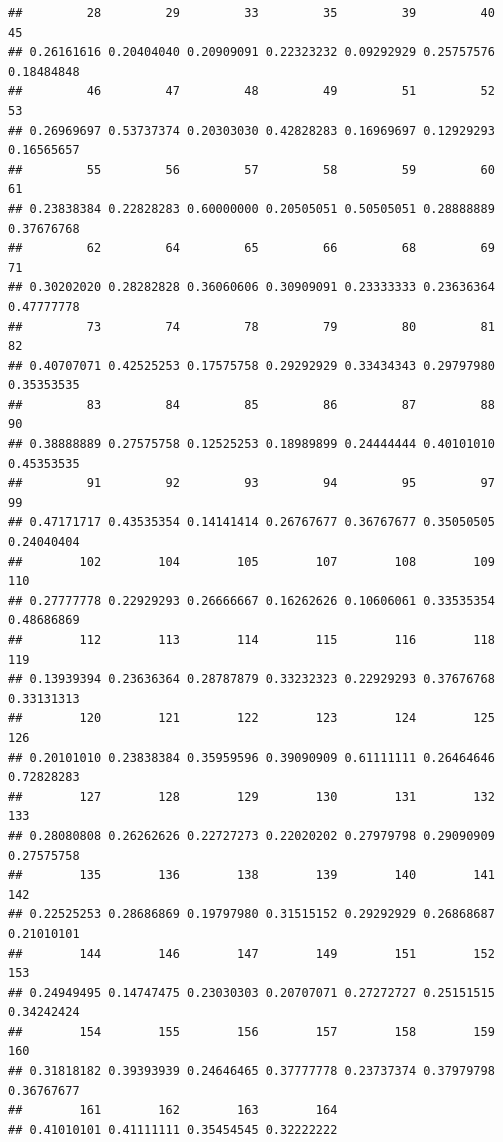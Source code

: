 \documentclass[
]{book}
\begin{document}
\begin{verbatim}
##         28         29         33         35         39         40         45 
## 0.26161616 0.20404040 0.20909091 0.22323232 0.09292929 0.25757576 0.18484848 
##         46         47         48         49         51         52         53 
## 0.26969697 0.53737374 0.20303030 0.42828283 0.16969697 0.12929293 0.16565657 
##         55         56         57         58         59         60         61 
## 0.23838384 0.22828283 0.60000000 0.20505051 0.50505051 0.28888889 0.37676768 
##         62         64         65         66         68         69         71 
## 0.30202020 0.28282828 0.36060606 0.30909091 0.23333333 0.23636364 0.47777778 
##         73         74         78         79         80         81         82 
## 0.40707071 0.42525253 0.17575758 0.29292929 0.33434343 0.29797980 0.35353535 
##         83         84         85         86         87         88         90 
## 0.38888889 0.27575758 0.12525253 0.18989899 0.24444444 0.40101010 0.45353535 
##         91         92         93         94         95         97         99 
## 0.47171717 0.43535354 0.14141414 0.26767677 0.36767677 0.35050505 0.24040404 
##        102        104        105        107        108        109        110 
## 0.27777778 0.22929293 0.26666667 0.16262626 0.10606061 0.33535354 0.48686869 
##        112        113        114        115        116        118        119 
## 0.13939394 0.23636364 0.28787879 0.33232323 0.22929293 0.37676768 0.33131313 
##        120        121        122        123        124        125        126 
## 0.20101010 0.23838384 0.35959596 0.39090909 0.61111111 0.26464646 0.72828283 
##        127        128        129        130        131        132        133 
## 0.28080808 0.26262626 0.22727273 0.22020202 0.27979798 0.29090909 0.27575758 
##        135        136        138        139        140        141        142 
## 0.22525253 0.28686869 0.19797980 0.31515152 0.29292929 0.26868687 0.21010101 
##        144        146        147        149        151        152        153 
## 0.24949495 0.14747475 0.23030303 0.20707071 0.27272727 0.25151515 0.34242424 
##        154        155        156        157        158        159        160 
## 0.31818182 0.39393939 0.24646465 0.37777778 0.23737374 0.37979798 0.36767677 
##        161        162        163        164 
## 0.41010101 0.41111111 0.35454545 0.32222222
\end{verbatim}
\end{document}
